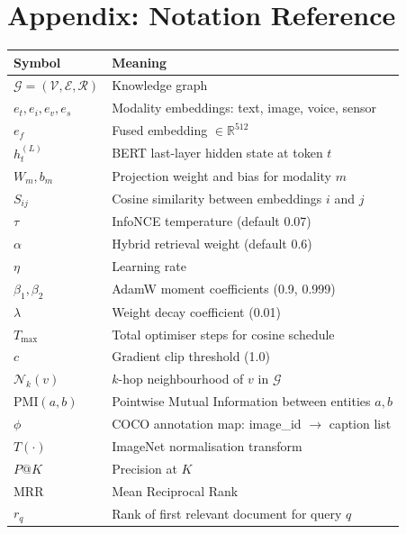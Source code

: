 \documentclass[12pt, a4paper]{article}
\theoremstyle{definition}
\theoremstyle{plain}
\theoremstyle{remark}
\begin{document}
\section*{Appendix: Notation Reference}

\begin{center}
\renewcommand{\arraystretch}{1.15}
\begin{tabular}{@{}lp{10cm}@{}}
\toprule
\textbf{Symbol} & \textbf{Meaning} \\
\midrule
$\mathcal{G}=(\mathcal{V},\mathcal{E},\mathcal{R})$ & Knowledge graph \\
$e_t,e_i,e_v,e_s$      & Modality embeddings: text, image, voice, sensor \\
$e_f$                   & Fused embedding $\in\mathbb{R}^{512}$ \\
$h_t^{(L)}$             & BERT last-layer hidden state at token $t$ \\
$W_m, b_m$              & Projection weight and bias for modality $m$ \\
$S_{ij}$                & Cosine similarity between embeddings $i$ and $j$ \\
$\tau$                  & InfoNCE temperature (default 0.07) \\
$\alpha$                & Hybrid retrieval weight (default 0.6) \\
$\eta$                  & Learning rate \\
$\beta_1,\beta_2$       & AdamW moment coefficients (0.9, 0.999) \\
$\lambda$               & Weight decay coefficient (0.01) \\
$T_{\max}$              & Total optimiser steps for cosine schedule \\
$c$                     & Gradient clip threshold (1.0) \\
$\mathcal{N}_k(v)$      & $k$-hop neighbourhood of $v$ in $\mathcal{G}$ \\
$\mathrm{PMI}(a,b)$     & Pointwise Mutual Information between entities $a,b$ \\
$\phi$                  & COCO annotation map: image\_id $\to$ caption list \\
$T(\cdot)$              & ImageNet normalisation transform \\
$P@K$                   & Precision at $K$ \\
$\mathrm{MRR}$          & Mean Reciprocal Rank \\
$r_q$                   & Rank of first relevant document for query $q$ \\
\bottomrule
\end{tabular}
\end{center}
\end{document}

